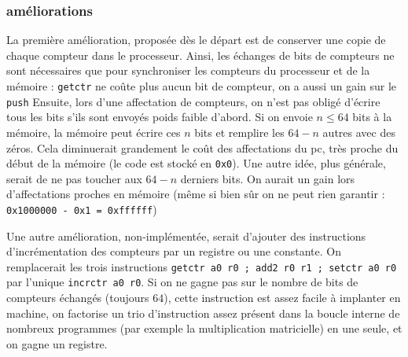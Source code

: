\documentclass[architecture]{compas2018}
\begin{document}
\subsubsection{améliorations}
La première amélioration, proposée dès le départ est de conserver une copie de chaque compteur dans le processeur. Ainsi, les échanges de bits de compteurs ne sont nécessaires que pour synchroniser les compteurs du processeur et de la mémoire : \texttt{getctr} ne coûte plus aucun bit de compteur, on a aussi un gain sur le \texttt{push}
Ensuite, lors d'une affectation de compteurs, on n'est pas obligé d'écrire tous les bits s'ils sont envoyés poids faible d'abord. Si on envoie $n\leqslant 64$ bits à la mémoire, la mémoire peut écrire ces $n$ bits et remplire les $64-n$ autres avec des zéros. Cela diminuerait grandement le coût des affectations du pc, très proche du début de la mémoire (le code est stocké en \texttt{0x0}). Une autre idée, plus générale, serait de ne pas toucher aux $64-n$ derniers bits. On aurait un gain lors d'affectations proches en mémoire (même si bien sûr on ne peut rien garantir : \texttt{0x1000000 - 0x1 = 0xffffff})\par
Une autre amélioration, non-implémentée, serait d'ajouter des instructions d'incrémentation des compteurs par un registre ou une constante. On remplacerait les trois instructions \texttt{getctr a0 r0 ; add2 r0 r1 ; setctr a0 r0} par l'unique \texttt{incrctr a0 r0}. Si on ne gagne pas sur le nombre de bits de compteurs échangés (toujours $64$), cette instruction est assez facile à implanter en machine, on factorise un trio d'instruction assez présent dans la boucle interne de nombreux programmes (par exemple la multiplication matricielle) en une seule, et on gagne un registre.
\end{document}
